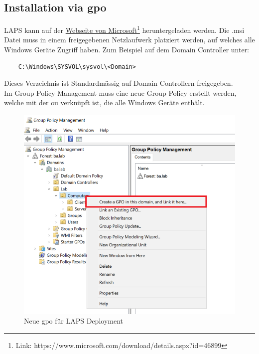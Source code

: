 \subsection{Installation via \acrshort{gpo}}
LAPS kann auf der \href{https://www.microsoft.com/download/details.aspx?id=46899}{Webseite von Microsoft}\footnote{Link: https://www.microsoft.com/download/details.aspx?id=46899} heruntergeladen werden.
Die .msi Datei muss in einem freigegebenen Netzlaufwerk platziert werden, auf welches alle Windows Geräte Zugriff haben.
Zum Beispiel auf dem Domain Controller unter:
\begin{lstlisting}
    C:\Windows\SYSVOL\sysvol\<Domain>
\end{lstlisting}
Dieses Verzeichnis ist Standardmässig auf Domain Controllern freigegeben.\\

Im Group Policy Management muss eine neue Group Policy erstellt werden, welche mit der \acrshort{ou} verknüpft ist, die alle Windows Geräte enthält.
\begin{figure}[H]
    \centering
    \includegraphics[width=0.7\linewidth]{../img/LAPS/GPO-Create-New.png}
    \caption{Neue \acrshort{gpo} für LAPS Deployment}
\end{figure}

